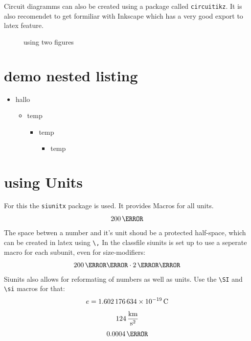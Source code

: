 \documentclass[	%
		11pt,a4paper,	%
		twoside,		%
		english,		%
		f1				%
	]{HsH-report}		%
\begin{document}
	Circuit diagramms can also be created using a package called \lstinline{circuitikz}. It is also recomendet to get formiliar with Inkscape which
	has a very good export to latex feature.
	\begin{figure}
		\graphicspath{{svg/build/}} %
		\hspace{2cm}
		\caption{using two figures}
	\end{figure}

\section{demo nested listing}
	\begin{itemize}
		\item hallo
		\begin{itemize}
			\item temp
			\begin{itemize}
				\item temp
				\begin{itemize}
					\item temp
				\end{itemize}
			\end{itemize}
		\end{itemize}
	\end{itemize}

\section{using Units}
	For this the \lstinline{siunitx} package is used. It provides Macros for all units.
	\begin{equation}
		200\,\ohm
	\end{equation}
	The space betwen a number and it's unit shoud be a protected half-space, which can be created in latex using \lstinline{\,} In the classfile
	siunits is set up to use a seperate macro for each subunit, even for size-modifiers:
	\begin{equation}
		200\,\milli\metre \cdot 2\,\mega\volt
	\end{equation}
	Siunits also allows for reformating of numbers as well as units. Use the \lstinline{\SI} and \lstinline{\si} macros for that:
	\begin{equation}
		e = \SI{1.602176634E-19}{\coulomb} %
	\end{equation}
	\begin{equation}
		124\,\si[per-mode=fraction]{\kilo\metre\per\second\squared} %
	\end{equation}
	\begin{equation}
		\num{0.0004}\,\lumen %
	\end{equation}
\end{document}
